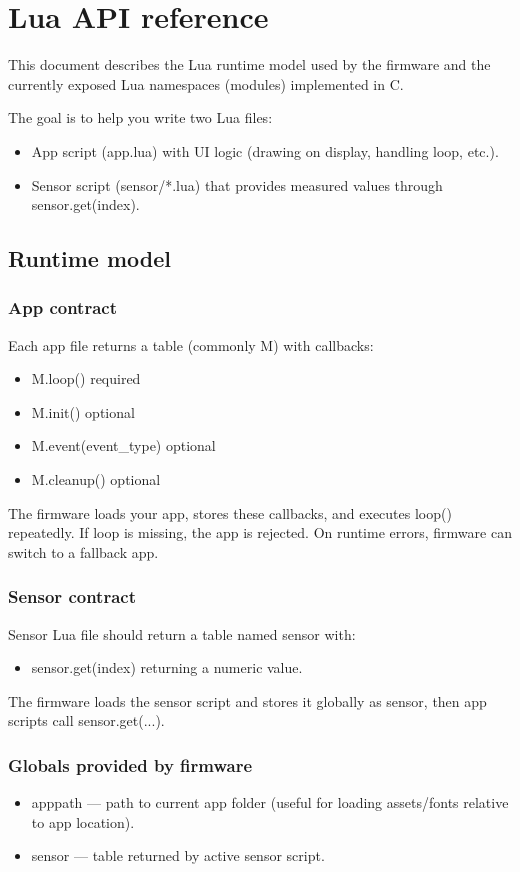 \chapter{Lua API reference}
This document describes the Lua runtime model used by the firmware and the currently exposed Lua namespaces (modules) implemented in C.

The goal is to help you write two Lua files:

\begin{itemize}
\item App script (app.lua) with UI logic (drawing on display, handling loop, etc.).
\item Sensor script (sensor/*.lua) that provides measured values through sensor.get(index).
\end{itemize}
\section{Runtime model}
\subsection{App contract}
Each app file returns a table (commonly M) with callbacks:

\begin{itemize}
\item M.loop() required
\item M.init() optional
\item M.event(event\_type) optional
\item M.cleanup() optional
\end{itemize}
The firmware loads your app, stores these callbacks, and executes loop() repeatedly. If loop is missing, the app is rejected. On runtime errors, firmware can switch to a fallback app.

\subsection{Sensor contract}
Sensor Lua file should return a table named sensor with:

\begin{itemize}
\item sensor.get(index) returning a numeric value.
\end{itemize}
The firmware loads the sensor script and stores it globally as sensor, then app scripts call sensor.get(...).

\subsection{Globals provided by firmware}
\begin{itemize}
\item apppath — path to current app folder (useful for loading assets/fonts relative to app location).
\item sensor — table returned by active sensor script.
\end{itemize}
